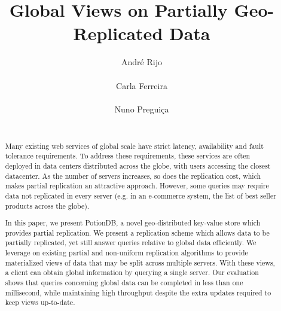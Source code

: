 \documentclass{vldb}
\newcommand{\grumbler}[2]{{\color{red}{\bf #1:} #2}}
\renewcommand{\grumbler}[2]{}
\newcommand{\andre}[1]{\grumbler{andre}{#1}}
\begin{document}
\title{Global Views on Partially Geo-Replicated Data}

\author{\alignauthor André Rijo\\
       \\
\alignauthor Carla Ferreira\\
       \\
\alignauthor
Nuno Preguiça\\
       \\
}


\maketitle

\begin{abstract}
\andre{Please review this}

Many existing web services of global scale have strict latency, availability and fault tolerance requirements.
To address these requirements, these services are often deployed in data centers distributed 
across the globe, with users accessing the closest datacenter.
As the number of servers increases, so does the replication cost, which makes partial replication an attractive approach.
However, some queries may require data not replicated in every server (e.g. in an e-commerce system, the list 
of best seller products across the globe).

In this paper, we present PotionDB, a novel geo-distributed key-value store which provides partial replication.
We present a replication scheme which allows data to be partially replicated, yet still answer queries relative to global data efficiently.
We leverage on existing partial and non-uniform replication algorithms to provide materialized views of data that may be split across multiple servers.
With these views, a client can obtain global information by querying a single server.
Our evaluation shows that queries concerning global data can be completed in less than one millisecond, while maintaining high throughput despite the extra updates required to keep views up-to-date. 

\end{abstract}
\end{document}
